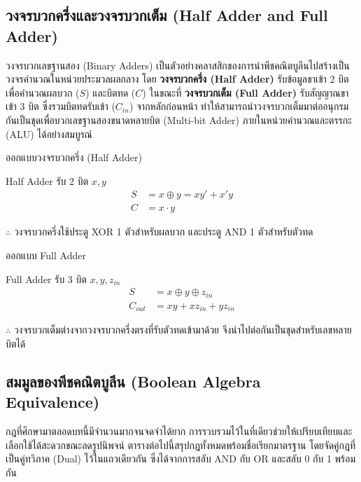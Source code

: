 \subsection{วงจรบวกครึ่งและวงจรบวกเต็ม (Half Adder and Full Adder)}
\label{sec:adders}
วงจรบวกเลขฐานสอง (Binary Adders) เป็นตัวอย่างคลาสสิกของการนำพีชคณิตบูลีนไปสร้างเป็นวงจรคำนวณในหน่วยประมวลผลกลาง โดย \textbf{วงจรบวกครึ่ง (Half Adder)} รับข้อมูลขาเข้า 2 บิตเพื่อคำนวณผลบวก ($S$) และบิตทด ($C$) ในขณะที่ \textbf{วงจรบวกเต็ม (Full Adder)} รับสัญญาณขาเข้า 3 บิต ซึ่งรวมบิตทดรับเข้า ($C_{in}$) จากหลักก่อนหน้า ทำให้สามารถนำวงจรบวกเต็มมาต่ออนุกรมกันเป็นชุดเพื่อบวกเลขฐานสองขนาดหลายบิต (Multi-bit Adder) ภายในหน่วยคำนวณและตรรกะ (ALU) ได้อย่างสมบูรณ์~\parencite{wakerly2018digital}

\begin{ex}[การออกแบบวงจรบวกครึ่ง]
\label{ex:half-adder}
ออกแบบวงจรบวกครึ่ง (Half Adder)
\end{ex}
\begin{solution}
Half Adder รับ 2 บิต $x, y$
\begin{align*}
S &= x \oplus y = x y' + x' y\\
C &= x \cdot y
\end{align*}

$\therefore$ วงจรบวกครึ่งใช้ประตู XOR 1 ตัวสำหรับผลบวก และประตู AND 1 ตัวสำหรับตัวทด \solhere
\end{solution}

\begin{ex}[การออกแบบวงจรบวกเต็ม]
\label{ex:full-adder}
ออกแบบ Full Adder
\end{ex}
\begin{solution}
Full Adder รับ 3 บิต $x, y, z_{in}$
\begin{align*}
S &= x \oplus y \oplus z_{in}\\
C_{out} &= x y + x z_{in} + y z_{in}
\end{align*}

$\therefore$ วงจรบวกเต็มต่างจากวงจรบวกครึ่งตรงที่รับตัวทดเข้ามาด้วย จึงนำไปต่อกันเป็นชุดสำหรับเลขหลายบิตได้ \solhere
\end{solution}

\subsection{สมมูลของพีชคณิตบูลีน (Boolean Algebra Equivalence)}
\label{sec:boolean-equivalence}
กฎที่ศึกษามาตลอดบทนี้มีจำนวนมากจนจดจำได้ยาก การรวบรวมไว้ในที่เดียวช่วยให้เปรียบเทียบและเลือกใช้ได้สะดวกขณะลดรูปนิพจน์ ตารางต่อไปนี้สรุปกฎทั้งหมดพร้อมชื่อเรียกมาตรฐาน โดยจัดคู่กฎที่เป็นคู่ทวิภาค (Dual) ไว้ในแถวเดียวกัน ซึ่งได้จากการสลับ AND กับ OR และสลับ 0 กับ 1 พร้อมกัน~\parencite{mano2018digital}

